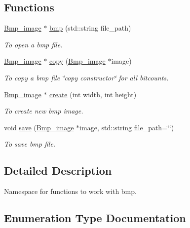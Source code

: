 \subsection*{Functions}
\begin{DoxyCompactItemize}
\item 
\hyperlink{classBmp__image}{Bmp\+\_\+image} $\ast$ \hyperlink{namespaceBmp_a0516017b061918b7c396d5a85a356d80}{bmp} (std\+::string file\+\_\+path)
\begin{DoxyCompactList}\small\item\em To open a bmp file. \end{DoxyCompactList}\item 
\hyperlink{classBmp__image}{Bmp\+\_\+image} $\ast$ \hyperlink{namespaceBmp_a8ddbb8d2fcb9df1522415088eae7e53f}{copy} (\hyperlink{classBmp__image}{Bmp\+\_\+image} $\ast$image)
\begin{DoxyCompactList}\small\item\em To copy a bmp file \char`\"{}copy constructor\char`\"{} for all bitcounts. \end{DoxyCompactList}\item 
\hyperlink{classBmp__image}{Bmp\+\_\+image} $\ast$ \hyperlink{namespaceBmp_a9f54637816ad1d1be6a5f700af19fb4d}{create} (int width, int height)
\begin{DoxyCompactList}\small\item\em To create new bmp image. \end{DoxyCompactList}\item 
void \hyperlink{namespaceBmp_a98d314a663fc3a6fe51b76d0e4a4811c}{save} (\hyperlink{classBmp__image}{Bmp\+\_\+image} $\ast$image, std\+::string file\+\_\+path=\char`\"{}\char`\"{})
\begin{DoxyCompactList}\small\item\em To save bmp file. \end{DoxyCompactList}\end{DoxyCompactItemize}


\subsection{Detailed Description}
Namespace for functions to work with bmp. 

\subsection{Enumeration Type Documentation}

